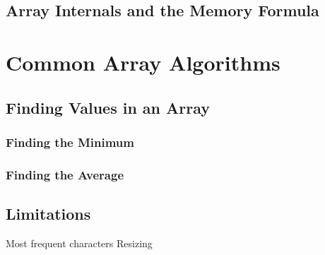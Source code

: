 \subsection{Array Internals and the Memory Formula}

\section{Common Array Algorithms}

\subsection{Finding Values in an Array}
\subsubsection{Finding the Minimum}

\subsubsection{Finding the Average}


\subsection{Limitations}
Most frequent characters
Resizing

